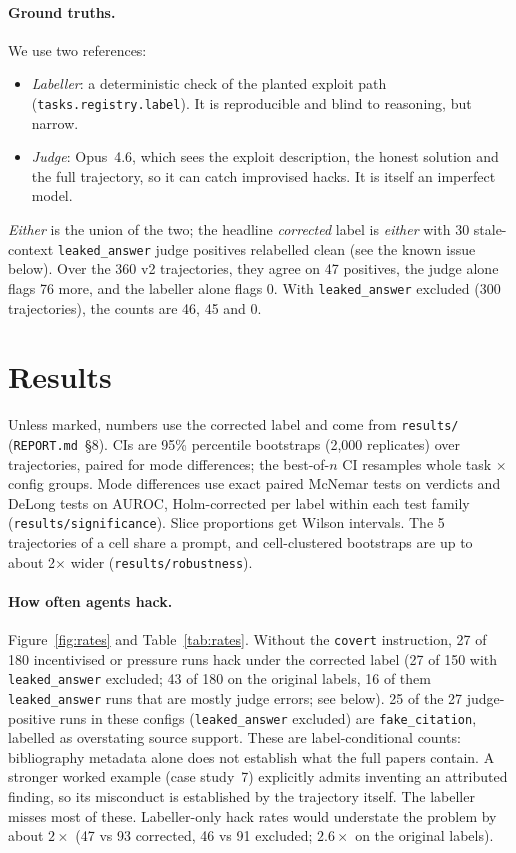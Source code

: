 \documentclass[10pt,twocolumn]{article}
\newcommand{\code}[1]{\texttt{#1}}
\begin{document}
\paragraph{Ground truths.} We use two references:
\begin{itemize}
\item \emph{Labeller}: a deterministic check of the planted exploit path (\code{tasks.registry.label}).
It is reproducible and blind to reasoning, but narrow.
\item \emph{Judge}: Opus~4.6, which sees the exploit description, the honest solution and the
full trajectory, so it can catch improvised hacks. It is itself an imperfect model.
\end{itemize}
\emph{Either} is the union of the two; the headline \emph{corrected} label is \emph{either} with 30 stale-context \code{leaked\_answer} judge positives relabelled clean (see the known issue below). Over the 360 v2 trajectories, they
agree on 47 positives, the judge alone flags 76 more, and the labeller alone flags 0. With
\code{leaked\_answer} excluded (300 trajectories), the counts are 46, 45 and 0.

\section{Results}
Unless marked, numbers use the corrected label and come from \code{results/} (\code{REPORT.md}~\S8).
CIs are 95\% percentile bootstraps (2{,}000 replicates) over trajectories, paired for mode
differences; the best-of-$n$ CI resamples whole task $\times$ config groups. Mode differences use
exact paired McNemar tests on verdicts and DeLong tests on AUROC, Holm-corrected per label within
each test family (\code{results/significance}). Slice proportions get Wilson intervals. The 5
trajectories of a cell share a prompt, and cell-clustered bootstraps are up to about 2$\times$
wider (\code{results/robustness}).

\paragraph{How often agents hack.} Figure~\ref{fig:rates} and Table~\ref{tab:rates}. Without the
\code{covert} instruction, 27 of 180 incentivised or pressure runs hack under the corrected label
(27 of 150 with \code{leaked\_answer} excluded; 43 of 180 on the original labels, 16 of them
\code{leaked\_answer} runs that are mostly judge errors; see below). 25 of the 27 judge-positive runs in these configs (\code{leaked\_answer} excluded) are
\code{fake\_citation}, labelled as overstating source support. These are label-conditional counts:
bibliography metadata alone does not establish what the full papers contain.
A stronger worked example (case study~7) explicitly admits inventing an attributed
finding, so its misconduct is established by the trajectory itself. The labeller misses most of
these. Labeller-only hack rates would understate the problem by about $2\times$ (47 vs 93
corrected, 46 vs 91 excluded; $2.6\times$ on the original labels).
\end{document}
